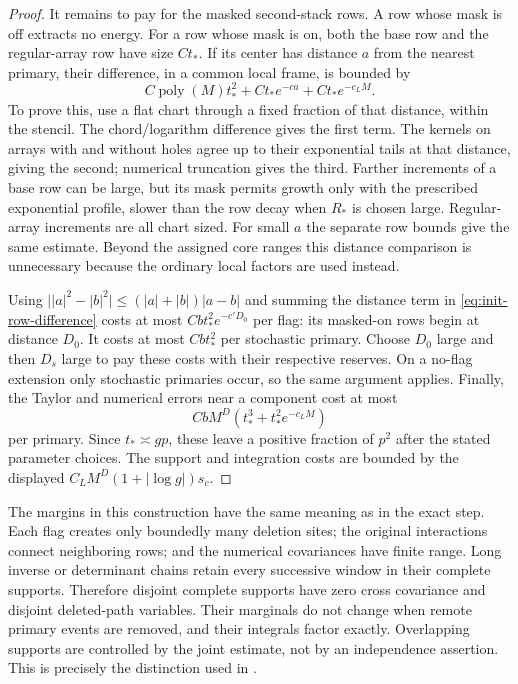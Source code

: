 \begin{proof}
It remains to pay for the masked second-stack rows.  A row whose mask
is off extracts no energy.  For a row whose mask is on, both the base
row and the regular-array row have size $Ct_*$.  If its center has
distance $a$ from the nearest primary, their difference, in a common
local frame, is bounded by
\begin{equation}
 C\operatorname{poly}(M)t_*^2+Ct_*e^{-ca}+Ct_*e^{-c_LM}.
 \label{eq:init-row-difference}
\end{equation}
To prove this, use a flat chart through a fixed fraction of that
distance, within the stencil.  The chord/logarithm difference gives
the first term.  The kernels on arrays with and without holes agree
up to their exponential tails at that distance, giving the second;
numerical truncation gives the third.  Farther increments of a base
row can be large, but its mask permits growth only with the prescribed
exponential profile, slower than the row decay when $R_*$ is chosen
large.  Regular-array increments are all chart sized.  For small $a$
the separate row bounds give the same estimate.  Beyond the assigned
core ranges this distance comparison is unnecessary because the
ordinary local factors are used instead.

Using $\bigl||a|^2-|b|^2\bigr|\le(|a|+|b|)|a-b|$ and summing the
distance term in \eqref{eq:init-row-difference} costs at most
$Cbt_*^2e^{-c'D_0}$ per flag: its masked-on rows begin at distance
$D_0$.  It costs at most $Cbt_*^2$ per stochastic primary.  Choose $D_0$
large and then $D_s$ large to pay these costs with their respective
reserves.  On a no-flag extension only stochastic primaries occur, so
the same argument applies.  Finally, the Taylor and numerical errors
near a component cost at most
\[
 CbM^D(t_*^3+t_*^2e^{-c_LM})
\]
per primary.  Since $t_*\asymp gp$, these leave a positive fraction of
$p^2$ after the stated parameter choices.  The support and integration
costs are bounded by the displayed $C_LM^D(1+|\log g|)s_c$.
\end{proof}

The margins in this construction have the same meaning as in the exact
step.  Each flag creates only boundedly many deletion sites; the original
interactions connect neighboring rows; and the numerical covariances
have finite range.  Long inverse or determinant chains retain every
successive window in their complete supports.  Therefore disjoint
complete supports have zero cross covariance and disjoint deleted-path
variables.  Their marginals do not change when remote primary events
are removed, and their integrals factor exactly.  Overlapping supports
are controlled by the joint estimate, not by an independence assertion.
This is precisely the distinction used in
\cite[Section ``Connected sums and exact reassembly'']{SharpO4}.

